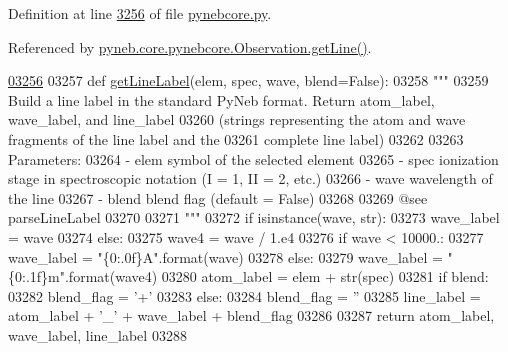 Definition at line \hyperlink{pynebcore_8py_source_l03256}{3256} of file \hyperlink{pynebcore_8py_source}{pynebcore.\-py}.



Referenced by \hyperlink{pynebcore_8py_source_l03665}{pyneb.\-core.\-pynebcore.\-Observation.\-get\-Line()}.


\begin{DoxyCode}
\hypertarget{namespacepyneb_1_1core_1_1pynebcore_l03256}{}\hyperlink{namespacepyneb_1_1core_1_1pynebcore_a14c882fc308d727f77ed33c1f56212e4}{03256} 
03257 \textcolor{keyword}{def }\hyperlink{namespacepyneb_1_1core_1_1pynebcore_a14c882fc308d727f77ed33c1f56212e4}{getLineLabel}(elem, spec, wave, blend=False):
03258     \textcolor{stringliteral}{"""}
03259 \textcolor{stringliteral}{    Build a line label in the standard PyNeb format. Return atom\_label, wave\_label, and line\_label }
03260 \textcolor{stringliteral}{            (strings representing the atom and wave fragments of the line label and the }
03261 \textcolor{stringliteral}{                complete line label)}
03262 \textcolor{stringliteral}{    }
03263 \textcolor{stringliteral}{    Parameters:}
03264 \textcolor{stringliteral}{        - elem      symbol of the selected element}
03265 \textcolor{stringliteral}{        - spec      ionization stage in spectroscopic notation (I = 1, II = 2, etc.)}
03266 \textcolor{stringliteral}{        - wave      wavelength of the line}
03267 \textcolor{stringliteral}{        - blend     blend flag (default = False)}
03268 \textcolor{stringliteral}{}
03269 \textcolor{stringliteral}{    @see parseLineLabel}
03270 \textcolor{stringliteral}{    }
03271 \textcolor{stringliteral}{    """}    
03272     \textcolor{keywordflow}{if} isinstance(wave, str):
03273         wave\_label = wave
03274     \textcolor{keywordflow}{else}:
03275         wave4 = wave / 1.e4
03276         \textcolor{keywordflow}{if} wave < 10000.:
03277             wave\_label = \textcolor{stringliteral}{"\{0:.0f\}A"}.format(wave)
03278         \textcolor{keywordflow}{else}:
03279             wave\_label = \textcolor{stringliteral}{"\{0:.1f\}m"}.format(wave4)
03280     atom\_label = elem + str(spec)
03281     \textcolor{keywordflow}{if} blend:
03282         blend\_flag = \textcolor{stringliteral}{'+'}
03283     \textcolor{keywordflow}{else}:
03284         blend\_flag = \textcolor{stringliteral}{''}
03285     line\_label = atom\_label + \textcolor{stringliteral}{'\_'} + wave\_label + blend\_flag
03286 
03287     \textcolor{keywordflow}{return} atom\_label, wave\_label, line\_label
03288 

\end{DoxyCode}
